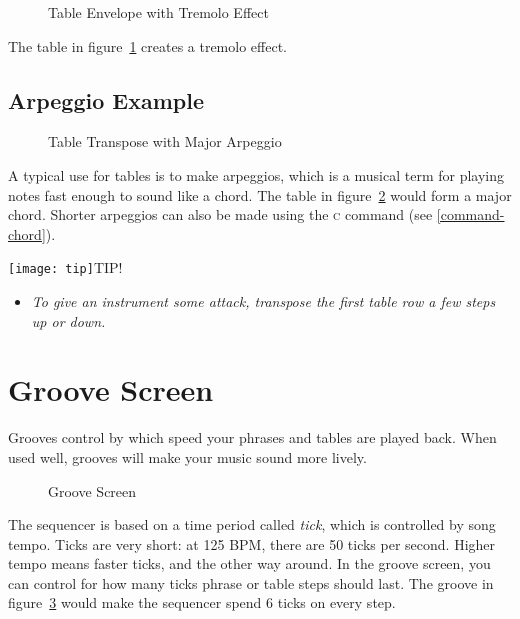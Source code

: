 \begin{figure}[htpb]
	\begin{center}
	\end{center}
	\caption{Table Envelope with Tremolo Effect}
	\label{fig:table-amp}
\end{figure}

The table in figure~\ref{fig:table-amp} creates a tremolo effect.

\subsection{Arpeggio Example}

\begin{figure}[htpb]
	\begin{center}
	\end{center}
	\caption{Table Transpose with Major Arpeggio}
	\label{fig:table-arp}
\end{figure}

A typical use for tables is to make arpeggios, which is a musical term for playing notes fast enough to sound like a chord. The table in figure~\ref{fig:table-arp} would form a major chord. Shorter arpeggios can also be made using the \textsc{c} command (see \ref{command-chord}).

\texttt{[image: tip]}TIP!
\begin{itemize}
	\item \textit{To give an instrument some attack, transpose the first table row a few steps up or down.}
\end{itemize}

\section{Groove Screen}

Grooves control by which speed your phrases and tables are played back. When used well, grooves will make your music sound more lively.

\begin{figure}[htbp]
	\begin{center}
	\end{center}
	\caption{Groove Screen}
	\label{fig:groove}
\end{figure}

The sequencer is based on a time period called \emph{tick}, which is controlled by song tempo.
Ticks are very short: at 125 BPM, there are 50 ticks per second.
Higher tempo means faster ticks, and the other way around. 
In the groove screen, you can control for how many ticks phrase or table steps should last.
The groove in figure~\ref{fig:groove} would make the sequencer spend 6 ticks on every step.

